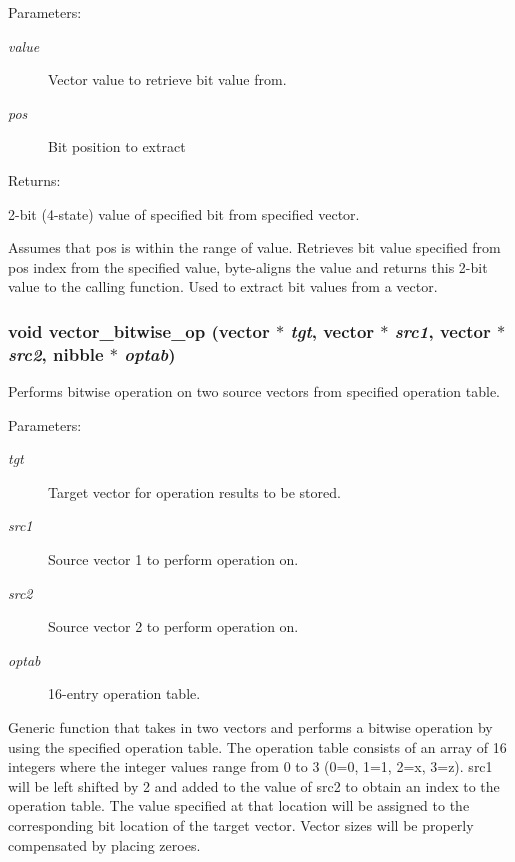 \begin{Desc}
\item[Parameters: ]\par
\begin{description}
\item[{\em 
value}]Vector value to retrieve bit value from. \item[{\em 
pos}]Bit position to extract \end{description}
\end{Desc}
\begin{Desc}
\item[Returns: ]\par
2-bit (4-state) value of specified bit from specified vector.\end{Desc}
Assumes that pos is within the range of value. Retrieves bit value specified from pos index from the specified value, byte-aligns the value and returns this 2-bit value to the calling function. Used to extract bit values from a vector. 
\subsubsection{\setlength{\rightskip}{0pt plus 5cm}void vector\_\-bitwise\_\-op ({\bf vector} $\ast$ {\em tgt}, {\bf vector} $\ast$ {\em src1}, {\bf vector} $\ast$ {\em src2}, {\bf nibble} $\ast$ {\em optab})}\label{vector_8h_a22}


Performs bitwise operation on two source vectors from specified operation table.

\begin{Desc}
\item[Parameters: ]\par
\begin{description}
\item[{\em 
tgt}]Target vector for operation results to be stored. \item[{\em 
src1}]Source vector 1 to perform operation on. \item[{\em 
src2}]Source vector 2 to perform operation on. \item[{\em 
optab}]16-entry operation table.\end{description}
\end{Desc}
Generic function that takes in two vectors and performs a bitwise operation by using the specified operation table. The operation table consists of an array of 16 integers where the integer values range from 0 to 3 (0=0, 1=1, 2=x, 3=z). src1 will be left shifted by 2 and added to the value of src2 to obtain an index to the operation table. The value specified at that location will be assigned to the corresponding bit location of the target vector. Vector sizes will be properly compensated by placing zeroes. 
